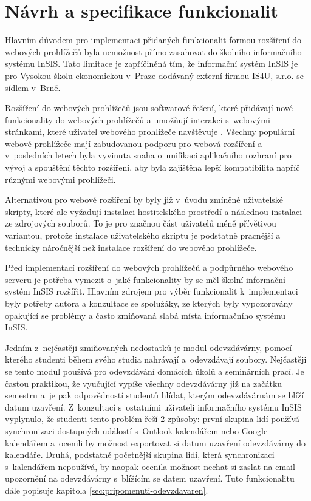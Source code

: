 \chapter{Návrh a specifikace funkcionalit}\label{chap:navrh-a-specifikace}

Hlavním důvodem pro implementaci přidaných funkcionalit formou rozšíření do webových prohlížečů byla nemožnost přímo zasahovat do školního informačního systému InSIS. Tato limitace je zapříčiněná tím, že informační systém InSIS je  pro Vysokou školu ekonomickou v~Praze dodávaný externí firmou IS4U, s.r.o. se sídlem v~Brně. 

Rozšíření do webových prohlížečů jsou softwarové řešení, které přidávají nové funkcionality do webových prohlížečů a umožňují interakci s~webovými stránkami, které uživatel webového prohlížeče navštěvuje \cite{web_extensions_2019}. Všechny populární webové prohlížeče mají zabudovanou podporu pro webová rozšíření a v~posledních letech byla vyvinuta snaha o~unifikaci aplikačního rozhraní pro vývoj a spouštění těchto rozšíření, aby byla zajištěna lepší kompatibilita napříč různými webovými prohlížeči.  

Alternativou pro webové rozšíření by byly již v~úvodu zmíněné uživatelské skripty, které ale vyžadují instalaci hostitelského prostředí a následnou instalaci ze zdrojových souborů. To je pro značnou část uživatelů méně přívětivou variantou, protože instalace uživatelského skriptu je podstatně pracnější a technicky náročnější než instalace rozšíření do webového prohlížeče. 

Před implementací rozšíření do webových prohlížečů a podpůrného webového serveru je potřeba vymezit o~jaké funkcionality by se měl školní informační systém InSIS rozšířit. 
Hlavním zdrojem pro výběr funkcionalit k~implementaci byly potřeby autora a konzultace se spolužáky, ze kterých byly vypozorovány opakující se problémy a často zmiňovaná slabá místa informačního systému InSIS. 

Jedním z~nejčastěji zmiňovaných nedostatků je modul odevzdávárny, pomocí kterého studenti během svého studia nahrávají a~odevzdávají soubory. Nejčastěji se tento modul používá pro odevzdávání domácích úkolů a seminárních prací. Je častou praktikou, že vyučující vypíše všechny odevzdávárny již na začátku semestru a~je pak odpovědností studentů hlídat, kterým odevzdávárnám se blíží datum uzavření. Z~konzultací s~ostatními uživateli informačního systému InSIS vyplynulo, že studenti tento problém řeší 2 způsoby: první skupina lidí používá synchronizaci dostupných událostí s~Outlook kalendářem nebo Google kalendářem a~ocenili by možnost exportovat si datum uzavření odevzdávárny do kalendáře. Druhá, podstatně početnější skupina lidí, která synchronizaci s~kalendářem nepoužívá, by naopak ocenila možnost nechat si zaslat na email upozornění na odevzdávárny s~blížícím se datem uzavření. Tuto funkcionalitu dále popisuje kapitola \ref{sec:pripomenuti-odevzdavaren}.

